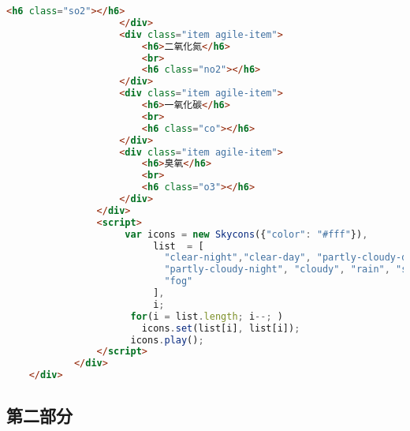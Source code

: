 \documentclass[12pt,AutoFakeBold]{article}
\begin{document}
\begin{appendices}
\begin{lstlisting}[language=html]
						<h6 class="so2"></h6>
					</div> 
					<div class="item agile-item">
                        <h6>二氧化氮</h6>
                        <br>
						<h6 class="no2"></h6>
					</div> 
					<div class="item agile-item">
                        <h6>一氧化碳</h6>
                        <br>
						<h6 class="co"></h6>
					</div>  
					<div class="item agile-item">
                        <h6>臭氧</h6>
                        <br>
						<h6 class="o3"></h6>
					</div> 
				</div>
				<script>
					 var icons = new Skycons({"color": "#fff"}),
						  list  = [
							"clear-night","clear-day", "partly-cloudy-day",
							"partly-cloudy-night", "cloudy", "rain", "sleet", "snow", "wind",
							"fog"
						  ],
						  i;
					  for(i = list.length; i--; )
						icons.set(list[i], list[i]);
					  icons.play();
				</script>
			</div>
	</div>
\end{lstlisting}

\subsection{第二部分}


\end{appendices}
\end{document}
